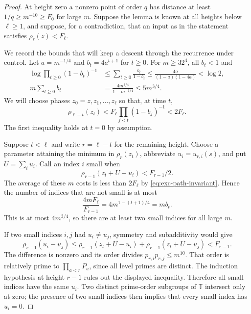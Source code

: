\begin{proof}
At height zero a nonzero point of order $q$ has distance at least
$1/q\ge m^{-10}\ge F_0$ for large $m$.  Suppose the lemma is known at all
heights below $\ell\ge1$, and suppose, for a contradiction, that an input
as in the statement satisfies $\rho_\ell(z)<F_\ell$.

We record the bounds that will keep a descent through the recurrence under
control.  Let $a=m^{-1/4}$ and $b_t=4a^{t+1}$ for $t\ge0$.  For
$m\ge32^4$, all $b_t<1$ and
\begin{align}
 \log\prod_{t\ge0}(1-b_t)^{-1}
 &\le \sum_{t\ge0}\frac{b_t}{1-b_t}
 \le \frac{4a}{(1-a)(1-4a)}<\log2,
 \label{eq:exc-product-cost}\\
 m\sum_{t\ge0}b_t
 &=\frac{4m^{3/4}}{1-m^{-1/4}}\le5m^{3/4}.
 \label{eq:exc-support-budget}
\end{align}
We will choose phases $z_0=z,z_1,\ldots,z_\ell$ so that, at time $t$,
\begin{equation}\label{eq:exc-path-invariant}
 \rho_{\ell-t}(z_t)
 <F_\ell\prod_{j<t}(1-b_j)^{-1}<2F_\ell .
\end{equation}
The first inequality holds at $t=0$ by assumption.

Suppose $t<\ell$ and write $r=\ell-t$ for the remaining height.  Choose a
parameter attaining the minimum in $\rho_r(z_t)$, abbreviate
$u_i=u_{r,i}(s)$, and put $U=\sum_i u_i$.  Call an index $i$ small when
\[
 \rho_{r-1}(z_t+U-u_i)<F_{r-1}/2.
\]
The average of these $m$ costs is less than $2F_\ell$ by
\eqref{eq:exc-path-invariant}.  Hence the number of indices that are not
small is at most
\begin{equation}\label{eq:exc-exception-count}
 \frac{4mF_\ell}{F_{r-1}}
   =4m^{1-(t+1)/4}=mb_t.
\end{equation}
This is at most $4m^{3/4}$, so there are at least two small indices for all
large $m$.

If two small indices $i,j$ had $u_i\ne u_j$, symmetry and subadditivity
would give
\[
 \rho_{r-1}(u_i-u_j)
 \le \rho_{r-1}(z_t+U-u_i)+\rho_{r-1}(z_t+U-u_j)
 <F_{r-1}.
\]
The difference is nonzero and its order divides
$p_{r,i}p_{r,j}\le m^{10}$.  That order is relatively prime to
$\prod_{a<r}P_a$, since all level primes are distinct.  The induction
hypothesis at height $r-1$ rules out the displayed inequality.  Therefore
all small indices have the same $u_i$.  Two distinct prime-order subgroups
of $\mathbb T$ intersect only at zero; the presence of two small indices
then implies that every small index has $u_i=0$.


\end{proof}
